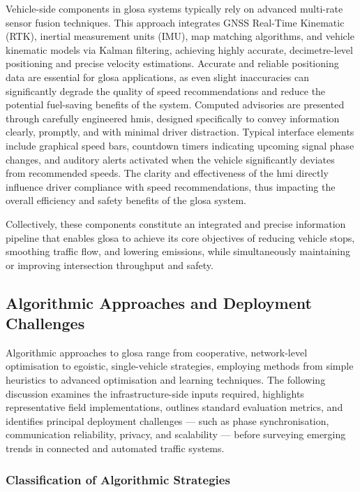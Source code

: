 Vehicle-side components in \ac{glosa} systems typically rely on advanced multi-rate sensor fusion techniques. This approach integrates GNSS Real-Time Kinematic (RTK), inertial measurement units (IMU), \ac{map} matching algorithms, and vehicle kinematic models via Kalman filtering, achieving highly accurate, decimetre-level positioning and precise velocity estimations. Accurate and reliable positioning data are essential for \ac{glosa} applications, as even slight inaccuracies can significantly degrade the quality of speed recommendations and reduce the potential fuel-saving benefits of the system. \cite{Vignarca2023} Computed advisories are presented through carefully engineered \acp{hmi}, designed specifically to convey information clearly, promptly, and with minimal driver distraction. Typical interface elements include graphical speed bars, countdown timers indicating upcoming signal phase changes, and auditory alerts activated when the vehicle significantly deviates from recommended speeds. The clarity and effectiveness of the \ac{hmi} directly influence driver compliance with speed recommendations, thus impacting the overall efficiency and safety benefits of the \ac{glosa} system.

Collectively, these components constitute an integrated and precise information pipeline that enables \ac{glosa} to achieve its core objectives of reducing vehicle stops, smoothing traffic flow, and lowering emissions, while simultaneously maintaining or improving intersection throughput and safety.


\subsection{Algorithmic Approaches and Deployment Challenges}
\label{subsec:glosa_algorithms_challenges}

Algorithmic approaches to \ac{glosa} range from cooperative, network-level optimisation to egoistic, single-vehicle strategies, employing methods from simple heuristics to advanced optimisation and learning techniques. The following discussion examines the infrastructure-side inputs required, highlights representative field implementations, outlines standard evaluation metrics, and identifies principal deployment challenges --- such as phase synchronisation, communication reliability, privacy, and scalability --- before surveying emerging trends in connected and automated traffic systems.

\subsubsection{Classification of Algorithmic Strategies}
\label{subsubsec:classification_algorithms}


